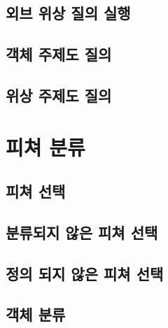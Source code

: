 \documentclass[12pt,a4paper,oneside]{book}
\begin{document}
	
	\newpage
	\section{외브 위상 질의 실행}
	

	\newpage
	\section{객체 주제도 질의}
	
	\newpage
	\section{위상 주제도 질의}
	
	
	


	
\newpage
\chapter{피쳐 분류}


	\newpage
	\section{피쳐 선택}
	
	
	\newpage
	\section{분류되지 않은 피쳐 선택}
	

	\newpage
	\section{정의 되지 않은 피쳐 선택}
	


	\newpage
	\section{객체 분류}
	

	\newpage
\end{document}
